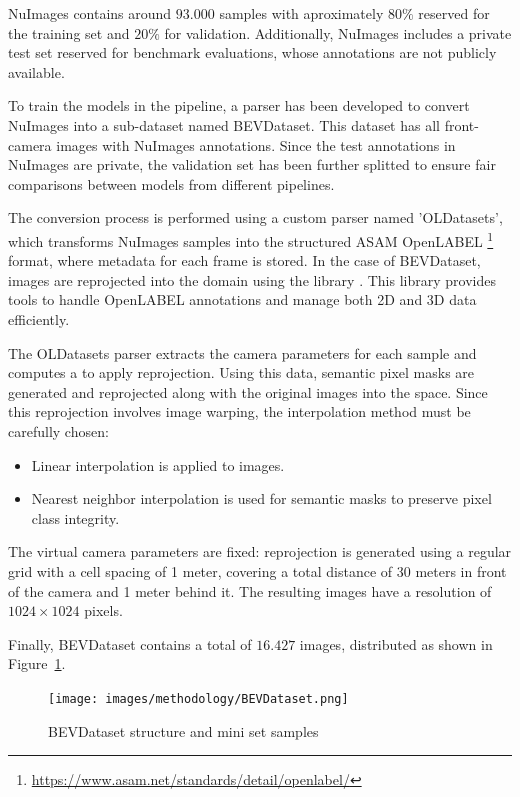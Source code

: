 NuImages contains around $93.000$ samples with aproximately $80\%$ reserved for the training set and $20\%$ for validation. Additionally, NuImages includes a private test set reserved for benchmark evaluations, whose annotations are not publicly available.

To train the models in the pipeline, a parser has been developed to convert NuImages into a sub-dataset named BEVDataset. This dataset has all front-camera images with NuImages annotations. Since the test annotations in NuImages are private, the validation set has been further splitted to ensure fair comparisons between models from different pipelines.

The conversion process is performed using a custom parser named 'OLDatasets', which transforms NuImages samples into the structured ASAM OpenLABEL \footnote{\url{https://www.asam.net/standards/detail/openlabel/}} format, where metadata for each frame is stored. In the case of BEVDataset, images are reprojected into the  domain using the  library \cite{VCD}. This library provides tools to handle OpenLABEL annotations and manage both 2D and 3D data efficiently.

The OLDatasets parser extracts the camera parameters for each sample and computes a  to apply  reprojection. Using this data, semantic pixel masks are generated and reprojected along with the original images into the  space. Since this reprojection involves image warping, the interpolation method must be carefully chosen:
\begin{itemize}
    \item Linear interpolation is applied to images.
    \item Nearest neighbor interpolation is used for semantic masks to preserve pixel class integrity. 
\end{itemize}

The virtual  camera parameters are fixed:  reprojection is generated using a regular grid with a cell spacing of 1 meter, covering a total distance of 30 meters in front of the camera and 1 meter behind it. The resulting images have a resolution of $1024 \times 1024$ pixels.

Finally, BEVDataset contains a total of $16.427$ images, distributed as shown in Figure~\ref{fig:bev_dataset}.

\begin{figure}[h!]
    \centering
    \texttt{[image: images/methodology/BEVDataset.png]}
    \caption{BEVDataset structure and mini set samples}
    \label{fig:bev_dataset}
\end{figure}

